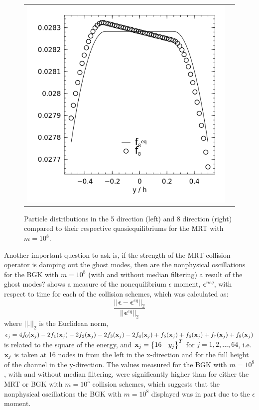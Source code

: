 \begin{figure}
\begin{tabulary}{\linewidth}{c c}
        \includegraphics[width=\figwid]{figs/poise-bingham/mrt/feq-vs-f_8.png}
    \end{tabulary}
    \caption{Particle distributions in the 5 direction (left) and 8 direction (right) compared to their respective quasiequilibriums for the MRT with $m = 10^8$.}
    \label{fig:feq-vs-f_mrt}
\end{figure}

Another important question to ask is, if the strength of the MRT collision operator is damping out the ghost modes, then are the nonphysical oscillations for the BGK with $m = 10^8$ (with and without median filtering) a result of the ghost modes?
 shows a measure of the nonequilibrium $\epsilon$ moment, $\boldsymbol{\epsilon}^{neq}$, with respect to time for each of the collision schemes, which was calculated as:
\begin{equation}
\frac{||\boldsymbol{\epsilon} - \boldsymbol{\epsilon}^{eq}||_2}{||\boldsymbol{\epsilon}^{eq}||_2}
\end{equation}
\noindent where $||.||_2$ is the Euclidean norm, $\epsilon_j = 4f_0(\mathbf{x}_j) - 2f_1(\mathbf{x}_j) - 2f_2(\mathbf{x}_j) - 2f_3(\mathbf{x}_j) - 2f_4(\mathbf{x}_j) + f_5(\mathbf{x}_j) + f_6(\mathbf{x}_j) + f_7(\mathbf{x}_j) + f_8(\mathbf{x}_j)$ is related to the square of the energy, and $\mathbf{x}_j = \begin{Bmatrix}16 & y_j\end{Bmatrix}^T$ for $j = 1, 2, ..., 64$, i.e. $\mathbf{x}_j$ is taken at 16 nodes in from the left in the x-direction and for the full height of the channel in the y-direction.
The values measured for the BGK with $m = 10^8$, with and without median filtering, were significantly higher than for either the MRT or BGK with $m = 10^5$ collision schemes, which suggests that the nonphysical oscillations the BGK with $m = 10^8$ displayed was in part due to the $\epsilon$ moment.

